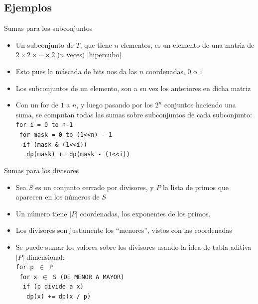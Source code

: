 \documentclass{beamer}
\begin{document}
\subsection{Ejemplos}

\begin{frame}{Sumas para los subconjuntos}
    \begin{itemize}
		\item Un subconjunto de $T$, que tiene $n$ elementos, es un elemento de una matriz de $2 \times 2 \times \cdots \times 2$ ($n$ veces) [hipercubo]
        \item Esto pues la máscada de bits nos da las $n$ coordenadas, $0$ o $1$
        \item Los subconjuntos de un elemento, son a su vez los anteriores en dicha matriz
        \item Con un for de $1$ a $n$, y luego pasando por los $2^n$ conjuntos haciendo una suma, se computan todas las sumas sobre subconjuntos de
        cada subconjunto: \\
        \texttt{for i = 0 to n-1}\\
        \texttt{\ for mask = 0 to (1<<n) - 1}\\
        \texttt{\ \ if (mask \& (1<<i))}\\
        \texttt{\ \ \ dp(mask) += dp(mask - (1<<i))}\\
        
    \end{itemize}
\end{frame}

\begin{frame}{Sumas para los divisores}
    \begin{itemize}
		\item Sea $S$ es un conjunto cerrado por divisores, y $P$ la lista de primos que aparecen en los números de $S$
        \item Un número tiene $|P|$ coordenadas, los exponentes de los primos.
        \item Los divisores son justamente los ``menores'', vistos con las coordenadas
        \item Se puede sumar los valores sobre los divisores usando la idea de tabla aditiva $|P|$ dimensional:\\
        \texttt{for p $\in$ P}\\
        \texttt{\ for x $\in$ S (DE MENOR A MAYOR)}\\
        \texttt{\ \ if (p divide a x)}\\
        \texttt{\ \ \ dp(x) += dp(x / p)}\\
        
    \end{itemize}
\end{frame}
\end{document}
